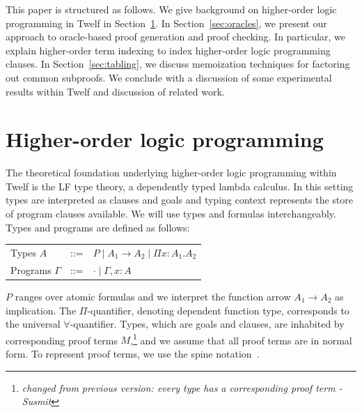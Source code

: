 \documentclass{acmconf}
\newcommand{\ednote}[1]{\footnote{\it #1}}
\begin{document}
This paper is structured as follows. We give background on
higher-order logic programming in Twelf in Section~\ref{sec:twelf}. In
Section~\ref{sec:oracles}, we present our approach to oracle-based
proof generation and proof checking. In particular, we explain
higher-order term indexing to index higher-order logic programming
clauses. In Section~\ref{sec:tabling}, we discuss memoization
techniques for factoring out common subproofs. We conclude with a
discussion of some experimental results within Twelf and discussion of
related work.

\section{Higher-order logic programming}\label{sec:twelf}


The theoretical foundation underlying higher-order logic programming
within Twelf is the LF type theory, a dependently typed lambda
calculus. In this setting types are interpreted as clauses and goals and
typing context represents the store of program clauses available. We
will use types and formulas interchangeably. Types and programs are
defined as follows: 

\begin{center}
\begin{tabular}[h]{lcl}
Types  $A$ & ::= & $P \mid  A_1 \rightarrow A_2 \mid \Pi x:A_1.A_2$ \\
Programs  $\Gamma$ & ::= & $\cdot \mid \Gamma, x:A$ 
\end{tabular}
\end{center}

$P$ ranges over atomic formulas and we interpret the function arrow
$A_1 \rightarrow A_2$ as implication. The $\Pi$-quantifier, denoting
dependent function type, corresponds to the universal
$\forall$-quantifier. Types, which are goals and clauses, are
inhabited by corresponding proof terms $M$,\ednote{changed from
previous version: every type has a corresponding proof term - Susmit}
and we assume that all proof terms are in normal form. To represent
proof terms, we use the spine notation~\cite{CervesatoPfenning01}.
\end{document}
